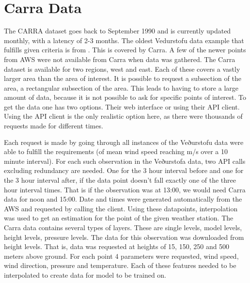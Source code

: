 \section{Carra Data}
The CARRA dataset goes back to September 1990 and is currently updated monthly, with a latency of 2-3 months. The oldest Vedurstofu data example that fulfills given criteria is from \startDateVedur. This is covered by Carra. A few of the newer points from AWS were not available from Carra when data was gathered. The Carra dataset is available for two regions, west and east. Each of these covers a vastly larger area than the area of interest. It is possible to request a subsection of the area, a rectangular subsection of the area. This leads to having to store a large amount of data, because it is not possible to ask for specific points of interest. To get the data one has two options. Their web interface or using their API client. Using the API client is the only realistic option here, as there were thousands of requests made for different times.

Each request is made by going through all instances of the Veðurstofu data were able to fulfill the requirements (of mean wind speed reaching \averageWindSpeedLimit m/s over a 10 minute interval). For each such observation in the Veðurstofa data, two API calls excluding redundancy are needed. One for the 3 hour interval before and one for the 3 hour interval after, if the data point doesn't fall exactly one of the three hour interval times. That is if the observation was at 13:00, we would need Carra data for noon and 15:00. Date and times were generated automatically from the AWS and requested by calling the client. Using these datapoints, interpolation was used to get an estimation for the point of the given weather station. The Carra data contains several types of layers. These are single levels, model levels, height levels, pressure levels. The data for this observation was downloaded from height levels. That is, data was requested at heights of 15, 150, 250 and 500 meters above ground. For each point 4 parameters were requested, wind speed, wind direction, pressure and temperature. Each of these features needed to be interpolated to create data for model to be trained on.

